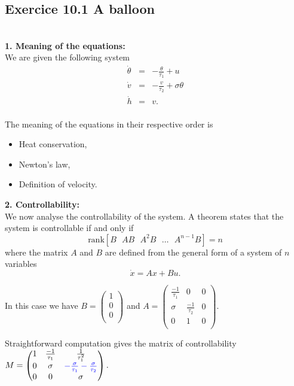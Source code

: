 
\subsection*{Exercice 10.1 A balloon}\\

\textbf{1. Meaning of the equations:}\\

We are given the following system
$$\begin{array}{lll}
\dot{\theta} & = & -\frac{\theta}{\tau_{1}}+u\\
\dot{v} & = & -\frac{v}{\tau_{2}}+\sigma\theta \\
\dot{h} & = & v.\\
\end{array}$$

The meaning of the equations in their respective order is
\begin{itemize}
\item Heat conservation,
\item Newton's law,
\item Definition of velocity.\\\end{itemize}


\textbf{2. Controllability:}\\

We now analyse the controllability of the system. A theorem states that the system is controllable if and only if 
$$\text{rank}[B \text{  } AB\text{  } A^{2}B \text{  }\dots\text{  } A^{n-1}B]=n$$
where the matrix $A$ and $B$ are defined from the general form of a system of $n$ variables
$$\dot{x}=Ax+Bu.$$

In this case we have $B=\begin{pmatrix}
1\\
0\\
0\\
\end{pmatrix}$ and $A=\begin{pmatrix}
\frac{-1}{\tau_{1}} & 0 & 0\\
\sigma & \frac{-1}{\tau_{2}} & 0 \\
0 & 1 & 0 \\
\end{pmatrix}.$

Straightforward computation gives the matrix of controllability $M=\begin{pmatrix}
1      & \frac{-1}{\tau_{1}} & \frac{1}{\tau_{1}^{2}}\\
0 & \sigma & \textcolor{blue}{-\frac{\sigma}{\tau_{1}}-\frac{\sigma}{\tau_{2}}} \\
0      & 0 & \sigma \\
\end{pmatrix}.$

